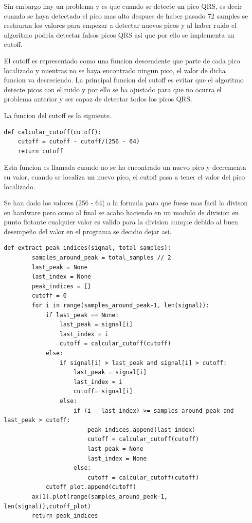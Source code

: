 Sin embargo hay un problema y es que cuando se detecte un pico QRS, es decir cuando se haya detectado el pico 
mas alto despues de haber pasado 72 samples se restauran los valores para empezar a detectar nuevos picos y al
haber ruido el algoritmo podria detectar falsos picos QRS asi que por ello se implementa un cutoff.

El cutoff es representado como una funcion descendente que parte de cada pico localizado y mientras no se haya
encontrado ningun pico, el valor de dicha funcion va decreciendo. La principal funcion del cutoff es evitar que
el algoritmo detecte picos con el ruido y por ello se ha ajustado para que no ocurra el problema anterior y 
ser capaz de detectar todos los picos QRS.

La funcion del cutoff es la siguiente.
\lstset{language=python, breaklines=true, basicstyle=\footnotesize}
\begin{lstlisting}[frame=single]
def calcular_cutoff(cutoff):
    cutoff = cutoff - cutoff/(256 - 64)
    return cutoff
\end{lstlisting}

Esta funcion es llamada cuando no se ha encontrado un nuevo pico y decrementa su valor, cuando se localiza un
nuevo pico, el cutoff pasa a tener el valor del pico localizado.

Se han dado los valores (256 - 64) a la formula para que fuese mas facil la divison en hardware pero como al final 
se acabo haciendo en un modulo de division en punto flotante cualquier valor es valido para la division aunque debido 
al buen desempeño del valor en el programa se decidio dejar asi.

\lstset{language=python, breaklines=true, basicstyle=\footnotesize}
\begin{lstlisting}[frame=single]
    def extract_peak_indices(signal, total_samples):
        samples_around_peak = total_samples // 2
        last_peak = None
        last_index = None
        peak_indices = []
        cutoff = 0
        for i in range(samples_around_peak-1, len(signal)):
            if last_peak == None:
                last_peak = signal[i]
                last_index = i
                cutoff = calcular_cutoff(cutoff)
            else:
                if signal[i] > last_peak and signal[i] > cutoff:
                    last_peak = signal[i]
                    last_index = i
                    cutoff= signal[i]
                else:
                    if (i - last_index) >= samples_around_peak and last_peak > cutoff:
                        peak_indices.append(last_index)
                        cutoff = calcular_cutoff(cutoff)
                        last_peak = None
                        last_index = None         
                    else:
                        cutoff = calcular_cutoff(cutoff)
            cutoff_plot.append(cutoff)
        ax[1].plot(range(samples_around_peak-1, len(signal)),cutoff_plot)
        return peak_indices
\end{lstlisting}

